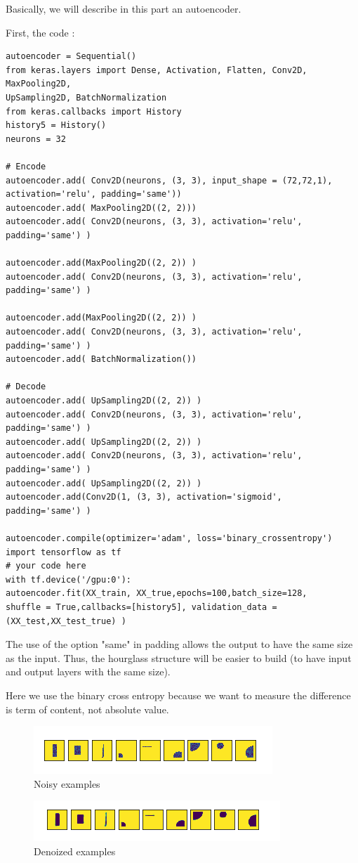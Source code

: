 \documentclass[]{article}
\begin{document}
Basically, we will describe in this part an autoencoder.

First, the code :
\begin{verbatim}
autoencoder = Sequential()
from keras.layers import Dense, Activation, Flatten, Conv2D, MaxPooling2D, 
UpSampling2D, BatchNormalization
from keras.callbacks import History 
history5 = History()
neurons = 32

# Encode
autoencoder.add( Conv2D(neurons, (3, 3), input_shape = (72,72,1), 
activation='relu', padding='same'))
autoencoder.add( MaxPooling2D((2, 2)))
autoencoder.add( Conv2D(neurons, (3, 3), activation='relu', padding='same') )

autoencoder.add(MaxPooling2D((2, 2)) )
autoencoder.add( Conv2D(neurons, (3, 3), activation='relu', padding='same') )

autoencoder.add(MaxPooling2D((2, 2)) )
autoencoder.add( Conv2D(neurons, (3, 3), activation='relu', padding='same') )
autoencoder.add( BatchNormalization())

# Decode
autoencoder.add( UpSampling2D((2, 2)) )
autoencoder.add( Conv2D(neurons, (3, 3), activation='relu', padding='same') )
autoencoder.add( UpSampling2D((2, 2)) )
autoencoder.add( Conv2D(neurons, (3, 3), activation='relu', padding='same') )
autoencoder.add( UpSampling2D((2, 2)) )
autoencoder.add(Conv2D(1, (3, 3), activation='sigmoid', padding='same') )

autoencoder.compile(optimizer='adam', loss='binary_crossentropy')
import tensorflow as tf
# your code here
with tf.device('/gpu:0'):
autoencoder.fit(XX_train, XX_true,epochs=100,batch_size=128, 
shuffle = True,callbacks=[history5], validation_data = (XX_test,XX_test_true) ) 
\end{verbatim}

The use of the option "same" in padding allows the output to have the same size as the input. Thus, the hourglass structure will be easier to build (to have input and output layers with the same size).

Here we use the binary cross entropy because we want to measure the difference is term of content, not absolute value.

\begin{figure}[h!]
	\centering
\includegraphics{figures/part6_test}
		\caption{Noisy examples}
		\label{fig:2figsA}
\end{figure}
\begin{figure}
\includegraphics{figures/part6_test_predict}
		\caption{Denoized examples}
		\label{fig:2figsB}

\end{figure}
\end{document}
